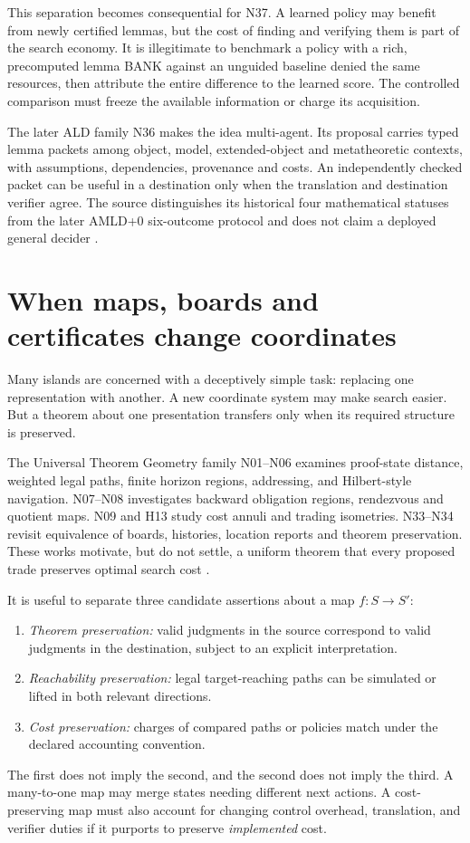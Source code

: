 \documentclass[11pt,letterpaper,oneside]{article}
\begin{document}
This separation becomes consequential for N37. A learned policy may benefit from newly certified lemmas, but the cost of finding and verifying them is part of the search economy. It is illegitimate to benchmark a policy with a rich, precomputed lemma BANK against an unguided baseline denied the same resources, then attribute the entire difference to the learned score. The controlled comparison must freeze the available information or charge its acquisition.

The later ALD family N36 makes the idea multi-agent. Its proposal carries typed lemma packets among object, model, extended-object and metatheoretic contexts, with assumptions, dependencies, provenance and costs. An independently checked packet can be useful in a destination only when the translation and destination verifier agree. The source distinguishes its historical four mathematical statuses from the later AMLD+0 six-outcome protocol and does not claim a deployed general decider \cite{n36}.

\section{When maps, boards and certificates change coordinates}
Many islands are concerned with a deceptively simple task: replacing one representation with another. A new coordinate system may make search easier. But a theorem about one presentation transfers only when its required structure is preserved.

The Universal Theorem Geometry family N01--N06 examines proof-state distance, weighted legal paths, finite horizon regions, addressing, and Hilbert-style navigation. N07--N08 investigates backward obligation regions, rendezvous and quotient maps. N09 and H13 study cost annuli and trading isometries. N33--N34 revisit equivalence of boards, histories, location reports and theorem preservation. These works motivate, but do not settle, a uniform theorem that every proposed trade preserves optimal search cost \cite{checkpoint,akm}.

It is useful to separate three candidate assertions about a map $f:S\to S'$:
\begin{enumerate}
 \item \emph{Theorem preservation:} valid judgments in the source correspond to valid judgments in the destination, subject to an explicit interpretation.
 \item \emph{Reachability preservation:} legal target-reaching paths can be simulated or lifted in both relevant directions.
 \item \emph{Cost preservation:} charges of compared paths or policies match under the declared accounting convention.
\end{enumerate}
The first does not imply the second, and the second does not imply the third. A many-to-one map may merge states needing different next actions. A cost-preserving map must also account for changing control overhead, translation, and verifier duties if it purports to preserve \emph{implemented} cost.
\end{document}
